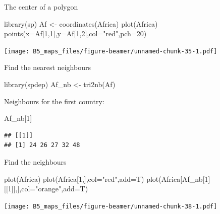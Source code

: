 \documentclass[
  10pt,
  ignorenonframetext,
]{beamer}
\newenvironment{Shaded}{\begin{snugshade}}{\end{snugshade}}
\newcommand{\DataTypeTok}[1]{\textcolor[rgb]{0.87,0.87,0.75}{#1}}
\newcommand{\DecValTok}[1]{\textcolor[rgb]{0.86,0.86,0.80}{#1}}
\newcommand{\KeywordTok}[1]{\textcolor[rgb]{0.94,0.87,0.69}{#1}}
\newcommand{\NormalTok}[1]{\textcolor[rgb]{0.80,0.80,0.80}{#1}}
\newcommand{\StringTok}[1]{\textcolor[rgb]{0.80,0.58,0.58}{#1}}
\begin{document}
\begin{frame}[fragile]{The center of a polygon}
\protect\hypertarget{the-center-of-a-polygon}{}

\begin{Shaded}
\begin{Highlighting}[]
\KeywordTok{library}\NormalTok{(sp)}
\NormalTok{Af <-}\StringTok{ }\KeywordTok{coordinates}\NormalTok{(Africa)}
\KeywordTok{plot}\NormalTok{(Africa)}
\KeywordTok{points}\NormalTok{(}\DataTypeTok{x=}\NormalTok{Af[}\DecValTok{1}\NormalTok{,}\DecValTok{1}\NormalTok{],}\DataTypeTok{y=}\NormalTok{Af[}\DecValTok{1}\NormalTok{,}\DecValTok{2}\NormalTok{],}\DataTypeTok{col=}\StringTok{"red"}\NormalTok{,}\DataTypeTok{pch=}\DecValTok{20}\NormalTok{)}
\end{Highlighting}
\end{Shaded}

\texttt{[image: B5\_maps\_files/figure-beamer/unnamed-chunk-35-1.pdf]}

\end{frame}

\begin{frame}[fragile]{Find the nearest neighbours}
\protect\hypertarget{find-the-nearest-neighbours}{}

\begin{Shaded}
\begin{Highlighting}[]
\KeywordTok{library}\NormalTok{(spdep)}
\NormalTok{Af_nb <-}\StringTok{ }\KeywordTok{tri2nb}\NormalTok{(Af)}
\end{Highlighting}
\end{Shaded}

Neighbours for the first country:

\begin{Shaded}
\begin{Highlighting}[]
\NormalTok{Af_nb[}\DecValTok{1}\NormalTok{]}
\end{Highlighting}
\end{Shaded}

\begin{verbatim}
## [[1]]
## [1] 24 26 27 32 48
\end{verbatim}

\end{frame}

\begin{frame}[fragile]{Find the neighbours}
\protect\hypertarget{find-the-neighbours}{}

\begin{Shaded}
\begin{Highlighting}[]
\KeywordTok{plot}\NormalTok{(Africa)}
\KeywordTok{plot}\NormalTok{(Africa[}\DecValTok{1}\NormalTok{,],}\DataTypeTok{col=}\StringTok{"red"}\NormalTok{,}\DataTypeTok{add=}\NormalTok{T)}
\KeywordTok{plot}\NormalTok{(Africa[Af_nb[}\DecValTok{1}\NormalTok{][[}\DecValTok{1}\NormalTok{]],],}\DataTypeTok{col=}\StringTok{"orange"}\NormalTok{,}\DataTypeTok{add=}\NormalTok{T)}
\end{Highlighting}
\end{Shaded}

\texttt{[image: B5\_maps\_files/figure-beamer/unnamed-chunk-38-1.pdf]}

\end{frame}
\end{document}
